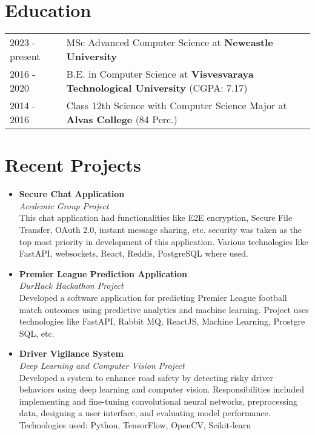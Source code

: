 \documentclass[a4paper,12pt]{article}
\begin{document}
\section{Education}
\begin{tabularx}{\linewidth}{@{}l X@{}} 
2023 - present & MSc Advanced Computer Science at \textbf{Newcastle University} \hfill \normalsize  \\
2016 - 2020 & B.E. in Computer Science at \textbf{Visvesvaraya Technological University} \hfill (CGPA: 7.17) \\
2014 - 2016 & Class 12th Science with Computer Science Major at \textbf{Alvas College} \hfill  (84 Perc.) \\
\end{tabularx}

\section{Recent Projects}
\begin{itemize}[leftmargin=*]
    \item \textbf{Secure Chat Application} \\
    \textit{Acedemic Group Project} \\
    This chat application had functionalities like E2E encryption, Secure File Transfer, OAuth 2.0, instant message sharing, etc. security was taken as the top most priority in development of this application. Various technologies like FastAPI, websockets, React, Reddis, PostgreSQL where used.
    \item \textbf{Premier League Prediction Application} \\
    \textit{DurHack Hackathon Project} \\
    Developed a software application for predicting Premier League football match outcomes using predictive analytics and machine learning. Project uses technologies like FastAPI, Rabbit MQ, ReactJS, Machine Learning, Prostgre SQL, etc.
    \item \textbf{Driver Vigilance System} \\
    \textit{Deep Learning and Computer Vision Project} \\
    Developed a system to enhance road safety by detecting risky driver behaviors using deep learning and computer vision. Responsibilities included implementing and fine-tuning convolutional neural networks, preprocessing data, designing a user interface, and evaluating model performance. Technologies used: Python, TensorFlow, OpenCV, Scikit-learn
\end{itemize}
\end{document}
